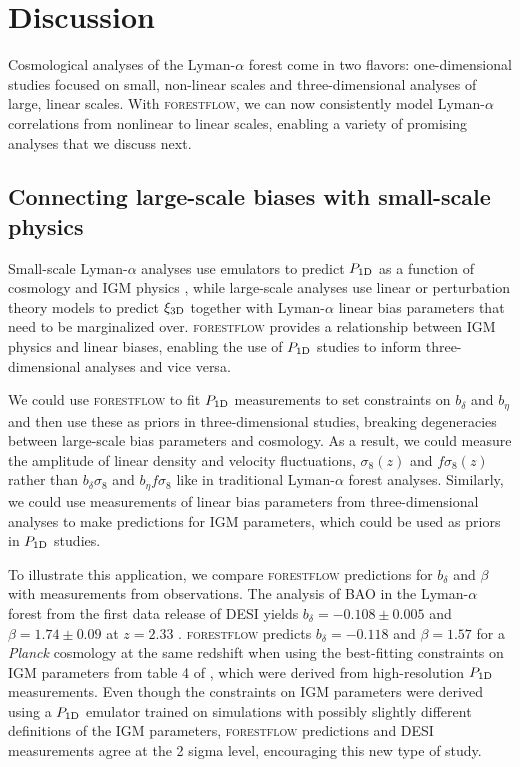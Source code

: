 \documentclass[fleqn,usenatbib]{mnras}
\newcommand{\lya}{Lyman-$\alpha$\xspace}
\newcommand{\lyaf}{Lyman-$\alpha$ forest\xspace}
\newcommand{\poned}{\ensuremath{P_{\rm 1D}}\xspace}
\newcommand{\xithreed}{\ensuremath{\xi_{\rm 3D}}\xspace}
\newcommand{\forestflow}{\textsc{forestflow}\xspace}
\begin{document}

\section{Discussion}
\label{sec:discussion}

Cosmological analyses of the \lya forest come in two flavors: one-dimensional studies focused on small, non-linear scales and three-dimensional analyses of large, linear scales. With \forestflow, we can now consistently model \lya correlations from nonlinear to linear scales, enabling a variety of promising analyses that we discuss next.


\subsection{Connecting large-scale biases with small-scale physics}
\label{sec:discussion_large_small}

Small-scale \lya analyses use emulators to predict \poned as a function of cosmology and IGM physics \citep[e.g.;][]{Pedersen2021, pedersen2023CompressingCosmologicalInformation, cabayol-garcia2023NeuralNetworkEmulator}, while large-scale analyses use linear or perturbation theory models to predict \xithreed together with \lya linear bias parameters that need to be marginalized over. \forestflow provides a relationship between IGM physics and linear biases, enabling the use of \poned studies to inform three-dimensional analyses and vice versa.

We could use \forestflow to fit \poned measurements to set constraints on $b_\delta$ and $b_\eta$ and then use these as priors in three-dimensional studies, breaking degeneracies between large-scale bias parameters and cosmology. As a result, we could measure the amplitude of linear density and velocity fluctuations, $\sigma_8(z)$ and $f \sigma_8(z)$ rather than $b_\delta \sigma_8$ and $b_\eta f \sigma_8$ like in traditional \lyaf analyses. Similarly, we could use measurements of linear bias parameters from three-dimensional analyses \citep{dumasdesbourboux2020CompletedSDSSIVExtended, 2024arXiv240403001D} to make predictions for IGM parameters, which could be used as priors in \poned studies.

To illustrate this application, we compare \forestflow predictions for $b_\delta$ and $\beta$ with measurements from observations. The analysis of BAO in the \lyaf from the first data release of DESI yields $b_\delta=-0.108\pm0.005$ and $\beta=1.74\pm0.09$ at $z=2.33$ \citep{desicollaboration2024DESI2024IV}. \forestflow predicts $b_\delta=-0.118$ and $\beta=1.57$ for a {\it Planck} cosmology at the same redshift when using the best-fitting constraints on IGM parameters from table 4 of \citet{emugp_Walther2019}, which were derived from high-resolution \poned measurements. Even though the constraints on IGM parameters were derived using a \poned emulator trained on simulations with possibly slightly different definitions of the IGM parameters, \forestflow predictions and DESI measurements agree at the 2 sigma level, encouraging this new type of study.
\end{document}

